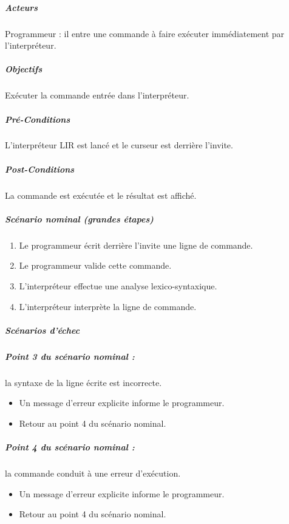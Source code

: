     \subparagraph{Acteurs}
    Programmeur : il entre une commande à faire exécuter immédiatement par l'interpréteur.

    \subparagraph{Objectifs}
    Exécuter la commande entrée dans l'interpréteur.

    \subparagraph{Pré-Conditions}
    L'interpréteur LIR est lancé et le curseur est derrière l'invite.

    \subparagraph{Post-Conditions}
    La commande est exécutée et le résultat est affiché.

    \subparagraph{Scénario nominal (grandes étapes)}
        \begin{enumerate}
            \item Le programmeur écrit derrière l'invite une ligne de commande.
            \item Le programmeur valide cette commande.
            \item L'interpréteur effectue une analyse lexico-syntaxique.
            \item L'interpréteur interprète la ligne de commande.
        \end{enumerate}

    \subparagraph{Scénarios d'échec}
        \subparagraph{Point 3 du scénario nominal :} la syntaxe de la ligne écrite est incorrecte.
        \begin{itemize}
            \item Un message d'erreur explicite informe le programmeur.
            \item Retour au point 4 du scénario nominal.
        \end{itemize}

        \subparagraph{Point 4 du scénario nominal :} la commande conduit à une erreur d'exécution.
        \begin{itemize}
            \item Un message d'erreur explicite informe le programmeur.
            \item Retour au point 4 du scénario nominal.
        \end{itemize}

%